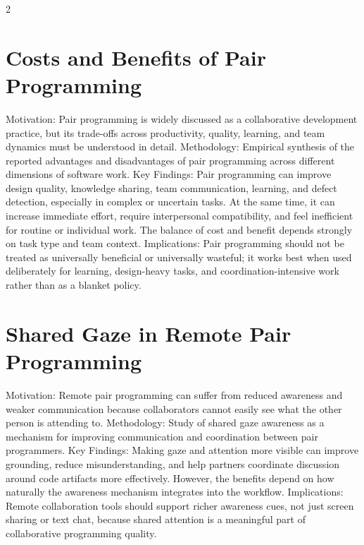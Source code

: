 \documentclass[8pt,a4paper]{extarticle}
\begin{document}
\begin{multicols*}{2}
    \section{Costs and Benefits of Pair Programming}
    Motivation: Pair programming is widely discussed as a collaborative development practice, but its trade-offs across productivity, quality, learning, and team dynamics must be understood in detail. Methodology: Empirical synthesis of the reported advantages and disadvantages of pair programming across different dimensions of software work. Key Findings: Pair programming can improve design quality, knowledge sharing, team communication, learning, and defect detection, especially in complex or uncertain tasks. At the same time, it can increase immediate effort, require interpersonal compatibility, and feel inefficient for routine or individual work. The balance of cost and benefit depends strongly on task type and team context. Implications: Pair programming should not be treated as universally beneficial or universally wasteful; it works best when used deliberately for learning, design-heavy tasks, and coordination-intensive work rather than as a blanket policy.

    \section{Shared Gaze in Remote Pair Programming}
    Motivation: Remote pair programming can suffer from reduced awareness and weaker communication because collaborators cannot easily see what the other person is attending to. Methodology: Study of shared gaze awareness as a mechanism for improving communication and coordination between pair programmers. Key Findings: Making gaze and attention more visible can improve grounding, reduce misunderstanding, and help partners coordinate discussion around code artifacts more effectively. However, the benefits depend on how naturally the awareness mechanism integrates into the workflow. Implications: Remote collaboration tools should support richer awareness cues, not just screen sharing or text chat, because shared attention is a meaningful part of collaborative programming quality.


\end{multicols*}
\end{document}

